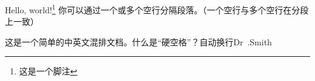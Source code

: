 \documentclass{ctexart}
\begin{document}
Hello, world!\footnote{这是一个脚注}
你可以通过一个或多个空行分隔段落。（一个空行与多个空行在分段上一致）

这是一个简单的中英文混排文档。什么是“硬空格”？自动换行Dr~.Smith
\end{document}
